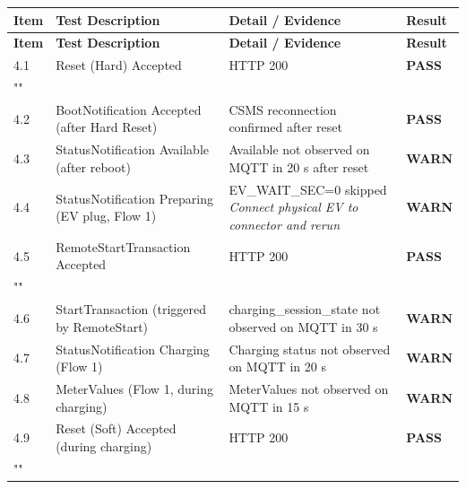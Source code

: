 \documentclass[10pt, a4paper]{article}
\begin{document}
\renewcommand{\arraystretch}{1.35}
\begin{longtable}{|L{1cm}|L{5.5cm}|M{7cm}|C{1.8cm}|}
\hline
{}
\textbf{Item} & \small\textbf{Test Description} & \small\textbf{Detail / Evidence} & \small\textbf{Result} \\
\hline
\endfirsthead
\hline
{}
\textbf{Item} & \small\textbf{Test Description} & \small\textbf{Detail / Evidence} & \small\textbf{Result} \\
\hline
\endhead
\hline
\endfoot
\small 4.1 & \small Reset (Hard)  Accepted & HTTP 200 & \textcolor{passgreen}{\textbf{PASS}} \\
\hline
{} \\
\hline
\small 4.2 & \small BootNotification  Accepted (after Hard Reset) & CSMS reconnection confirmed after reset & \textcolor{passgreen}{\textbf{PASS}} \\
\hline
\small 4.3 & \small StatusNotification Available (after reboot) & Available not observed on MQTT in 20 s after reset & \textcolor{warnorange}{\textbf{WARN}} \\
\hline
\small 4.4 & \small StatusNotification Preparing (EV plug, Flow 1) & EV\_WAIT\_SEC=0  skipped{\newline\normalfont\footnotesize\itshape Connect physical EV to connector and rerun} & \textcolor{warnorange}{\textbf{WARN}} \\
\hline
\small 4.5 & \small RemoteStartTransaction  Accepted & HTTP 200 & \textcolor{passgreen}{\textbf{PASS}} \\
\hline
{} \\
\hline
\small 4.6 & \small StartTransaction (triggered by RemoteStart) & charging\_session\_state not observed on MQTT in 30 s & \textcolor{warnorange}{\textbf{WARN}} \\
\hline
\small 4.7 & \small StatusNotification Charging (Flow 1) & Charging status not observed on MQTT in 20 s & \textcolor{warnorange}{\textbf{WARN}} \\
\hline
\small 4.8 & \small MeterValues (Flow 1, during charging) & MeterValues not observed on MQTT in 15 s & \textcolor{warnorange}{\textbf{WARN}} \\
\hline
\small 4.9 & \small Reset (Soft)  Accepted (during charging) & HTTP 200 & \textcolor{passgreen}{\textbf{PASS}} \\
\hline
{} \\

\end{longtable}
\end{document}
